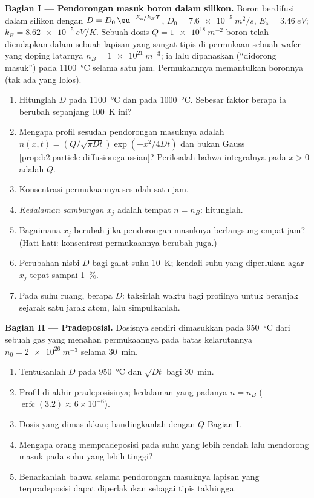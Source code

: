 \begin{problem}\label{pb:b2:particle-diffusion:1}
\textbf{Bagian I --- Pendorongan masuk boron dalam silikon.}
Boron berdifusi dalam silikon dengan $D = D_0\,\eu^{-E_{\text{a}}/k_BT}$, $D_0 =
\qty{7.6e-5}{m^2/s}$, $E_{\text{a}} = \qty{3.46}{eV}$; $k_B =
\qty{8.62e-5}{eV/K}$. Sebuah dosis $Q = \qty{1e18}{m^{-2}}$ boron telah
diendapkan dalam sebuah lapisan yang sangat tipis di permukaan sebuah wafer yang
doping latarnya $n_B = \qty{1e21}{m^{-3}}$; ia lalu dipanaskan
(``didorong masuk'') pada \qty{1100}{\celsius} selama satu jam. Permukaannya
memantulkan boronnya (tak ada yang lolos).
\begin{enumerate}
  \item Hitunglah $D$ pada \qty{1100}{\celsius} dan pada \qty{1000}{\celsius}.
        Sebesar faktor berapa ia berubah sepanjang \qty{100}{K} ini?
  \item Mengapa profil sesudah pendorongan masuknya adalah $n(x,t) = (Q/\sqrt{\pi
        Dt})\exp(-x^2/4Dt)$ dan bukan Gauss
        \cref{prop:b2:particle-diffusion:gaussian}? Periksalah bahwa
        integralnya pada $x > 0$ adalah $Q$.
  \item Konsentrasi permukaannya sesudah satu jam.
  \item \emph{Kedalaman sambungan} $x_j$ adalah tempat $n = n_B$: hitunglah.
  \item Bagaimana $x_j$ berubah jika pendorongan masuknya berlangsung empat jam?
        (Hati-hati: konsentrasi permukaannya berubah juga.)
  \item Perubahan nisbi $D$ bagi galat suhu \qty{10}{K};
        kendali suhu yang diperlukan agar $x_j$ tepat sampai \qty{1}{\%}.
  \item Pada suhu ruang, berapa $D$: taksirlah waktu bagi profilnya untuk
        beranjak sejarak satu jarak atom, lalu simpulkanlah.
\end{enumerate}

\textbf{Bagian II --- Pradeposisi.}
Dosisnya sendiri dimasukkan pada \qty{950}{\celsius} dari sebuah gas yang menahan
permukaannya pada batas kelarutannya $n_0 = \qty{2e26}{m^{-3}}$ selama
\qty{30}{min}.
\begin{enumerate}[resume]
  \item Tentukanlah $D$ pada \qty{950}{\celsius} dan $\sqrt{Dt}$ bagi \qty{30}{min}.
  \item Profil di akhir pradeposisinya; kedalaman yang padanya $n =
        n_B$ ($\operatorname{erfc}(3.2) \approx 6 \times 10^{-6}$).
  \item Dosis yang dimasukkan; bandingkanlah dengan $Q$ Bagian I.
  \item Mengapa orang mempradeposisi pada suhu yang lebih rendah lalu mendorong masuk pada
        suhu yang lebih tinggi?
  \item Benarkanlah bahwa selama pendorongan masuknya lapisan yang terpradeposisi dapat
        diperlakukan sebagai tipis takhingga.
\end{enumerate}


\end{problem}
